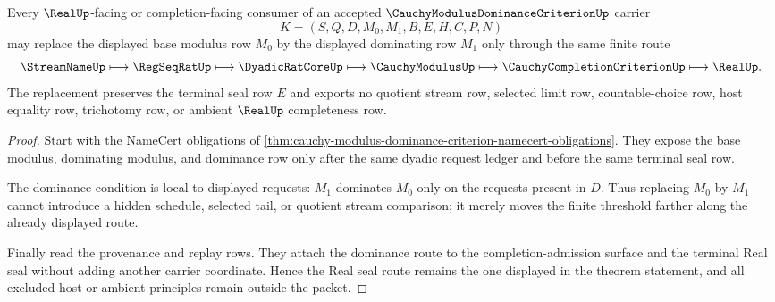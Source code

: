 \begin{theorem}
\label{thm:cauchy-modulus-dominance-criterion-real-seal-route}
Every $\RealUp$-facing or completion-facing consumer of an accepted $\CauchyModulusDominanceCriterionUp$ carrier
$$
K=(S,Q,D,M_0,M_1,B,E,H,C,P,N)
$$
may replace the displayed base modulus row $M_0$ by the displayed dominating row $M_1$ only through the same finite route
$$
\StreamNameUp \longmapsto \RegSeqRatUp \longmapsto \DyadicRatCoreUp \longmapsto \CauchyModulusUp \longmapsto \CauchyCompletionCriterionUp \longmapsto \RealUp .
$$
The replacement preserves the terminal seal row $E$ and exports no quotient stream row, selected limit row, countable-choice row, host equality row, trichotomy row, or ambient $\RealUp$ completeness row.
\end{theorem}
\begin{proof}
Start with the NameCert obligations of \autoref{thm:cauchy-modulus-dominance-criterion-namecert-obligations}. They expose the base modulus, dominating modulus, and dominance row only after the same dyadic request ledger and before the same terminal seal row.

The dominance condition is local to displayed requests: $M_1$ dominates $M_0$ only on the requests present in $D$. Thus replacing $M_0$ by $M_1$ cannot introduce a hidden schedule, selected tail, or quotient stream comparison; it merely moves the finite threshold farther along the already displayed route.

Finally read the provenance and replay rows. They attach the dominance route to the completion-admission surface and the terminal Real seal without adding another carrier coordinate. Hence the Real seal route remains the one displayed in the theorem statement, and all excluded host or ambient principles remain outside the packet.
\end{proof}



